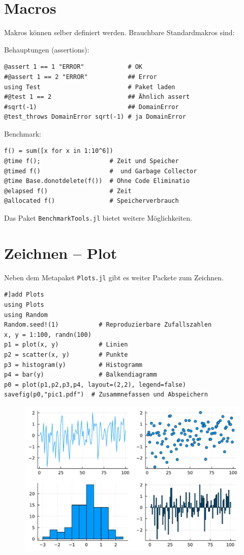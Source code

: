 \documentclass[10pt,twocolumn]{scrartcl}
\begin{document}
\section{Macros}
\label{sec:macros}

Makros können selber definiert werden. Brauchbare Standardmakros sind:

Behauptungen (assertions):
\begin{lstlisting}
@assert 1 == 1 "ERROR"            # OK
#@assert 1 == 2 "ERROR"           ## Error
using Test                        # Paket laden
#@test 1 == 2                     ## Ähnlich assert
#sqrt(-1)                         ## DomainError
@test_throws DomainError sqrt(-1) # ja DomainError
\end{lstlisting}

Benchmark:
\begin{lstlisting}
f() = sum([x for x in 1:10^6])
@time f();                   # Zeit und Speicher
@timed f()                   #  und Garbage Collector
@time Base.donotdelete(f())  # Ohne Code Eliminatio
@elapsed f()                 # Zeit
@allocated f()               # Speicherverbrauch
\end{lstlisting}
Das Paket \lstinline|BenchmarkTools.jl| bietet weitere Möglichkeiten.

\section{Zeichnen -- Plot}
\label{sec:plot}

Neben dem Metapaket \lstinline|Plots.jl| gibt es weiter Packete zum Zeichnen.
\begin{lstlisting}
#]add Plots
using Plots
using Random
Random.seed!(1)           # Reproduzierbare Zufallszahlen
x, y = 1:100, randn(100)
p1 = plot(x, y)           # Linien
p2 = scatter(x, y)        # Punkte
p3 = histogram(y)         # Histogramm
p4 = bar(y)               # Balkendiagramm
p0 = plot(p1,p2,p3,p4, layout=(2,2), legend=false)
savefig(p0,"pic1.pdf")  # Zusammnefassen und Abspeichern
\end{lstlisting}

\begin{figure}[h]
  \centering
  \includegraphics[width=.95\columnwidth]{pic.pdf}
\end{figure}
\end{document}
